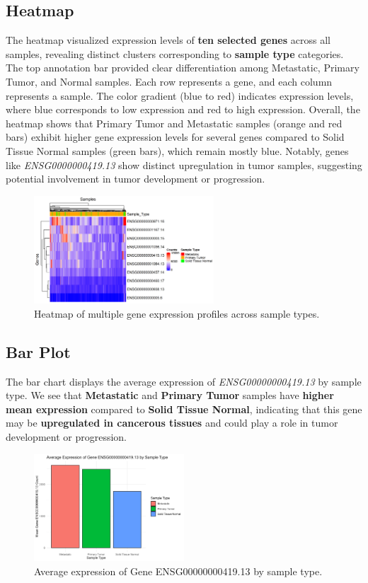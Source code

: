 \documentclass{article}
\begin{document}
\subsection{Heatmap}
The heatmap visualized expression levels of \textbf{ten selected genes} across all samples, revealing distinct clusters corresponding to \textbf{sample type} categories. The top annotation bar provided clear differentiation among Metastatic, Primary Tumor, and Normal samples.
Each row represents a gene, and each column represents a sample. The color gradient (blue to red) indicates expression levels, where blue corresponds to low expression and red to high expression. Overall, the heatmap shows that Primary Tumor and Metastatic samples (orange and red bars) exhibit higher gene expression levels for several genes compared to Solid Tissue Normal samples (green bars), which remain mostly blue. Notably, genes like \textit{ENSG0000000419.13} show distinct upregulation in tumor samples, suggesting potential involvement in tumor development or progression.
\begin{figure}[H]
    \centering
    \includegraphics[width=0.6\textwidth]{final_project_heatmap.png}
    \caption{Heatmap of multiple gene expression profiles across sample types.}
    \label{fig:heatmap}
\end{figure}

\subsection{Bar Plot}
The bar chart displays the average expression of \textit{ENSG00000000419.13} by sample type. We see that \textbf{Metastatic} and \textbf{Primary Tumor} samples have \textbf{higher mean expression} compared to \textbf{Solid Tissue Normal}, indicating that this gene may be \textbf{upregulated in cancerous tissues} and could play a role in tumor development or progression. 

\begin{figure}[h]
    \centering
    \includegraphics[width=0.5\textwidth]{final_project_bar_plot.png}
    \caption{Average expression of Gene ENSG00000000419.13 by sample type.}
    \label{fig:barplot}
\end{figure}
\end{document}
